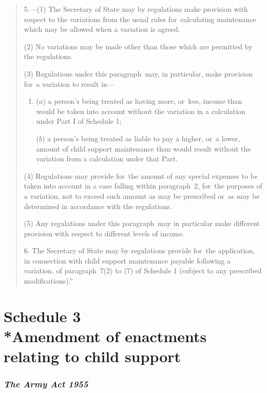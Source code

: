 \documentclass[12pt,a4paper]{article}
\begin{document}
\begin{quotation}
5.---(1) The Secretary of State may by regulations make provision with respect to the variations from the usual rules for~calculating maintenance which may be allowed when a variation is agreed.

(2) No variations may be made other than those which are permitted by the regulations.

(3) Regulations under this paragraph~may, in particular, make provision for~a variation to result in—
\begin{enumerate}\item[]
($a$) a person’s being treated as having more, or~less, income than would be taken into account without the variation in a calculation under Part I of Schedule 1;

($b$) a person’s being treated as liable to pay a higher, or~a lower, amount of child support maintenance than would result without the variation from a calculation under that Part.
\end{enumerate}

(4) Regulations may provide for~the amount of any special expenses to be taken into account in a case falling within paragraph~2, for~the purposes of a variation, not to exceed such amount as may be prescribed or~as may be determined in accordance with the regulations.

(5) Any regulations under this paragraph~may in particular make different provision with respect to different levels of income.

\medskip

6. The Secretary of State may by regulations provide for~the application, in connection with child support maintenance payable following a variation, of paragraph~7(2)  to (7)  of Schedule 1 (subject to any prescribed modifications).”
\end{quotation}

\vfill

\part[Schedule 3 --- Amendment of enactments relating to child support]{Schedule 3\\*Amendment of enactments relating to child support}

\renewcommand\parthead{--- Schedule 3}

\section*{\itshape The Army Act 1955}
\end{document}
